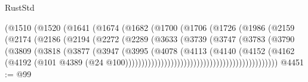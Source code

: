 \begin{lexlean}{RustStd}
\begin{coremodule}
                                (@1510
                                  (@1520
                                    (@1641
                                      (@1674
                                        (@1682
                                          (@1700
                                            (@1706
                                              (@1726
                                                (@1986
                                                  (@2159
                                                    (@2174
                                                      (@2186
                                                        (@2194
                                                          (@2272
                                                            (@2289
                                                              (@3633
                                                                (@3739
                                                                  (@3747
                                                                    (@3783
                                                                      (@3790
                                                                        (@3809
                                                                          (@3818
                                                                            (@3877
                                                                              (@3947
                                                                                (@3995
                                                                                  (@4078
                                                                                    (@4113
                                                                                      (@4140
                                                                                        (@4152
                                                                                          (@4162
                                                                                            (@4192
                                                                                              (@101
                                                                                                @4389
                                                                                                (@24
                                                                                                  @100)))))))))))))))))))))))))))))))))))))))))))))))
@4451 := @99

\end{coremodule}
\end{lexlean}
